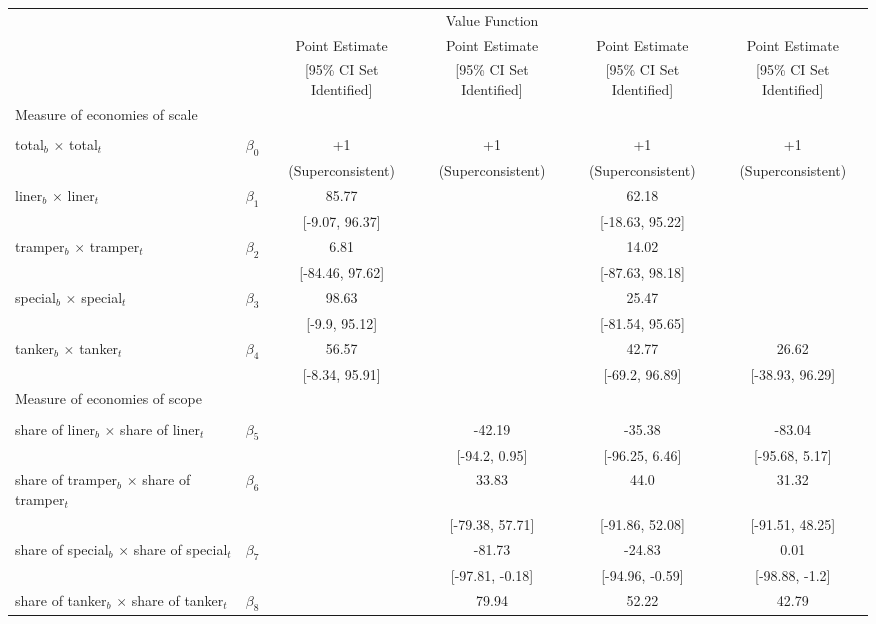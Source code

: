 \begin{tabular}{@{\extracolsep{5pt}}lccccc}
\toprule 
 &  &  & Value Function &  &  \\
 &  & Point Estimate & Point Estimate & Point Estimate & Point Estimate \\
 &  & [95\% CI Set Identified] & [95\% CI Set Identified] & [95\% CI Set Identified] & [95\% CI Set Identified] \\
\midrule 
Measure of economies of scale &  &  &  &  &  \\
 &  &  &  &  \\
total$_{b}$ $\times$ total$_{t}$ & $\beta_0$ & +1 & +1 & +1 & +1 \\
 &  & (Superconsistent) & (Superconsistent) & (Superconsistent) & (Superconsistent) \\
liner$_{b}$ $\times$ liner$_{t}$ & $\beta_1$ & 85.77 &  & 62.18 &  \\
 &  & [-9.07, 96.37] &  & [-18.63, 95.22] &  \\
tramper$_{b}$ $\times$ tramper$_{t}$ & $\beta_2$ & 6.81 &  & 14.02 &  \\
 &  & [-84.46, 97.62] &  & [-87.63, 98.18] &  \\
special$_{b}$ $\times$ special$_{t}$ & $\beta_3$ & 98.63 &  & 25.47 &  \\
 &  & [-9.9, 95.12] &  & [-81.54, 95.65] &  \\
tanker$_{b}$ $\times$ tanker$_{t}$ & $\beta_4$ & 56.57 &  & 42.77 & 26.62 \\
 &  & [-8.34, 95.91] &  & [-69.2, 96.89] & [-38.93, 96.29] \\
Measure of economies of scope &  &  &  &  &  \\
 &  &  &  &  &  \\
share of liner$_{b}$ $\times$ share of liner$_{t}$ & $\beta_5$ &  & -42.19 & -35.38 & -83.04 \\
 &  &  & [-94.2, 0.95] & [-96.25, 6.46] & [-95.68, 5.17] \\
share of tramper$_{b}$ $\times$ share of tramper$_{t}$ & $\beta_6$ &  & 33.83 & 44.0 & 31.32 \\
 &  &  & [-79.38, 57.71] & [-91.86, 52.08] & [-91.51, 48.25] \\
share of special$_{b}$ $\times$ share of special$_{t}$ & $\beta_7$ &  & -81.73 & -24.83 & 0.01 \\
 &  &  & [-97.81, -0.18] & [-94.96, -0.59] & [-98.88, -1.2] \\
share of tanker$_{b}$ $\times$ share of tanker$_{t}$ & $\beta_8$ &  & 79.94 & 52.22 & 42.79 \\

\end{tabular}
